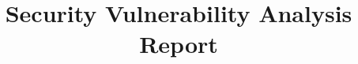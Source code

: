 \documentclass{orizon-recon-report-style}
\begin{document}
\frontmatter

\title{Security Vulnerability Analysis Report}
\reportdate{\monthname{} \the\year}

\makecover



\mainmatter

\begin{multicols}{2}



\end{multicols}

\clearpage %

\makebackcover
\end{document}
